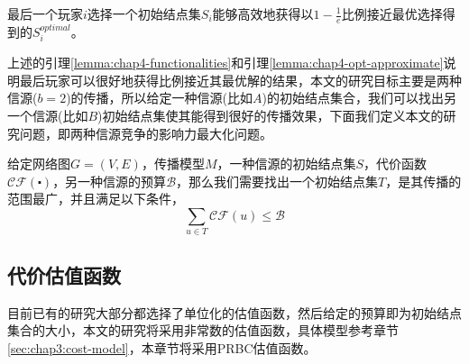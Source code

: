 \begin{lemma}
\label{lemma:chap4-opt-approximate}
最后一个玩家$i$选择一个初始结点集$S_{i}$能够高效地获得以$1-\frac{1}{e}$比例接近最优选择得到的$S_{i}^{optimal}$。
\end{lemma}

上述的引理\ref{lemma:chap4-functionalities}和引理\ref{lemma:chap4-opt-approximate}说明最后玩家可以很好地获得比例接近其最优解的结果，本文的研究目标主要是两种信源($b=2$)的传播，所以给定一种信源(比如$A$)的初始结点集合，我们可以找出另一个信源(比如$B$)初始结点集使其能得到很好的传播效果，下面我们定义本文的研究问题，即两种信源竞争的影响力最大化问题。
\begin{definition}
\label{def:chap4-self-on-cim}
给定网络图$G=(V,E)$，传播模型$M$，一种信源的初始结点集$S$，代价函数$\mathcal{CF}(\centerdot)$，另一种信源的预算$\mathcal{B}$，那么我们需要找出一个初始结点集$T$，是其传播的范围最广，并且满足以下条件，
\begin{displaymath}
\sum_{u \in T}\mathcal{CF}(u) \leq \mathcal{B}
\end{displaymath}
\end{definition}

\subsection{代价估值函数}
目前已有的研究大部分都选择了单位化的估值函数，然后给定的预算即为初始结点集合的大小，本文的研究将采用非常数的估值函数，具体模型参考章节\ref{sec:chap3:cost-model}，本章节将采用PRBC估值函数。




